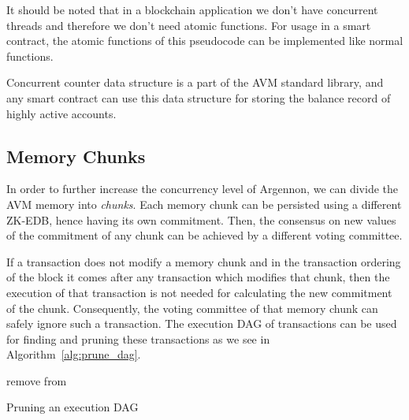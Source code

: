 \documentclass[a4paper]{report}
\begin{document}
    It should be noted that in a blockchain application we don't have concurrent threads and therefore we don't need
    atomic functions. For usage in a smart contract, the atomic functions of this pseudocode can be implemented like
    normal functions.

    Concurrent counter data structure is a part of the AVM standard library, and any smart contract can use this data
    structure for storing the balance record of highly active accounts.

    \subsection{Memory Chunks}\label{subsec:memory-chunks}

    In order to further increase the concurrency level of Argennon, we can divide the AVM memory into \emph{chunks}.
    Each memory chunk can be persisted using a different ZK-EDB, hence having its own commitment. Then, the
    consensus on new values of the commitment of any chunk can be achieved by a different voting committee.

    If a transaction does not modify a memory chunk and in the transaction ordering of the block it comes after
    any transaction which modifies that chunk, then the execution of that transaction is not needed for calculating
    the new commitment of the chunk. Consequently, the voting committee of that memory chunk can safely ignore such a
    transaction. The execution DAG of transactions can be used for finding and pruning these transactions as
    we see in Algorithm~\ref{alg:prune_dag}.

    \begin{algorithm}
        \DontPrintSemicolon
        \BlankLine
        {
            \RPrune{\V}\;
        }
        \BlankLine
        \Fn{\RPrune{\V}}
        {
            {
                remove \V from \Graph\;
                {
                    \;
                }
            }
        }
        \caption{Pruning an execution DAG}\label{alg:prune_dag}
    \end{algorithm}
\end{document}

